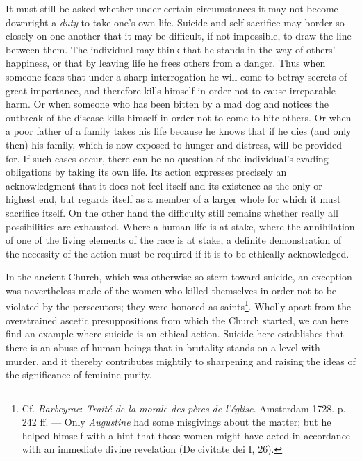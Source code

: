 \documentclass[12pt,a4paper,openany]{book}
\newcommand{\opage}[1]{\marginnote{\footnotesize\textit{[#1]}}}
\begin{document}
It must still be asked whether under certain circumstances it may not become downright a \textit{duty} to take
one's own life. Suicide and self-sacrifice may border so closely on one another that it may be difficult, if not
impossible, to draw the line between them. The individual may think that he stands in the way of others' happiness,
or that by leaving life he frees others from a danger. Thus when someone fears that under a sharp interrogation he
will come to betray secrets of great importance, and therefore kills himself in order not to cause irreparable
harm. Or when someone who has been bitten by a mad dog and notices the outbreak of the disease kills himself in
order not to come to bite others. Or when a poor father of a family takes his life because he knows that if he
dies (and only then) his family, which is now exposed to hunger and distress, will be provided for. If such cases
occur, there can be no question of the individual's evading obligations by taking its own life. Its action
expresses precisely an acknowledgment that it does not feel itself and its existence as the only or highest end,
but regards itself as a member of a larger whole for which it must sacrifice itself. On the other hand the
difficulty still remains whether really all possibilities are exhausted. Where a human life is at stake, where the
annihilation of one of the living elements of the race is at stake, a definite demonstration of the necessity of
the action must be required if it is to be ethically acknowledged.

In the ancient Church, which was otherwise so stern toward suicide, an exception was nevertheless made of the women
who killed themselves in order not to be violated by the persecutors; they were honored as
saints\footnote[1]{Cf. \emph{Barbeyrac}: \textit{Traité de la morale des pères de l'église.} Amsterdam 1728. p.
242 ff. --- Only \emph{Augustine} had some misgivings about the matter; but he helped himself with a hint that
those women might have acted in accordance with an immediate divine revelation (De civitate dei I, 26).}. Wholly
apart from the overstrained
\opage{219}ascetic presuppositions from which the Church started, we can here find an example where suicide is an
ethical action. Suicide here establishes that there is an abuse of human beings that in brutality stands on a
level with murder, and it thereby contributes mightily to sharpening and raising the ideas of the significance
of feminine purity.
\end{document}
